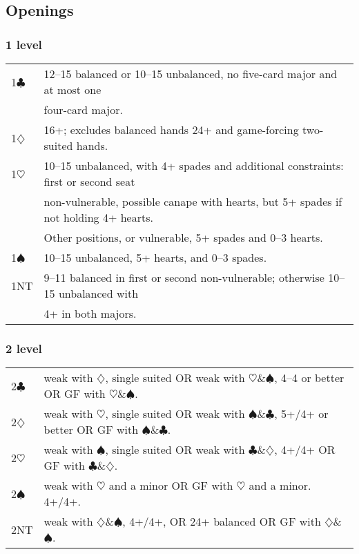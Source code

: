 \documentclass[a4paper,12pt]{article}
\begin{document}
\subsection{Openings}

\subsubsection{1 level}

\begin{tabular}{ll}
1$\clubsuit$  & 12--15 balanced or 10--15 unbalanced, no five-card major and at most one \\
	 & four-card major.\\
1$\diamondsuit$  & 16+; excludes balanced hands 24+ and game-forcing two-suited hands.\\
1$\heartsuit$  & 10--15 unbalanced, with 4+ spades and additional constraints: first or
      second seat\\
	 & non-vulnerable, possible canape with hearts, but 5+ spades if
      not holding 4+ hearts. \\
	 & Other positions, or vulnerable, 5+ spades and 0--3 hearts.\\
1$\spadesuit$  & 10--15 unbalanced, 5+ hearts, and 0--3 spades.\\
1NT & 9--11 balanced in first or second non-vulnerable; otherwise 10--15
      unbalanced with \\
	 & 4+ in both majors.\\
\end{tabular}

\subsubsection{2 level}

\begin{tabular}{ll}
2$\clubsuit$  & weak with $\diamondsuit$, single suited OR weak with $\heartsuit$\&$\spadesuit$, 4--4 or better OR GF with $\heartsuit$\&$\spadesuit$.\\
2$\diamondsuit$  & weak with $\heartsuit$, single suited OR weak with $\spadesuit$\&$\clubsuit$, 5+/4+ or better OR GF with $\spadesuit$\&$\clubsuit$.\\
2$\heartsuit$  & weak with $\spadesuit$, single suited OR weak with $\clubsuit$\&$\diamondsuit$, 4+/4+ OR GF with $\clubsuit$\&$\diamondsuit$.\\
2$\spadesuit$  & weak with $\heartsuit$ and a minor OR GF with $\heartsuit$ and a minor. 4+/4+.\\
2NT & weak with $\diamondsuit$\&$\spadesuit$, 4+/4+, OR 24+ balanced OR GF with $\diamondsuit$\&$\spadesuit$.\\
\end{tabular}
\end{document}
